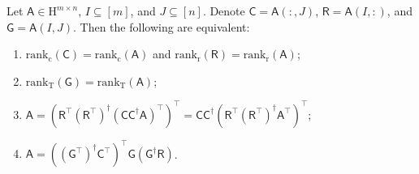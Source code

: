 \documentclass[onefignum,onetabnum]{siamart250211}
\newcommand{\Hilb}{\mathrm{H}}
\newcommand{\Batrix}[1]{\bm{\Matrix{#1}}}
\newcommand{\Matrix}[1]{\mathsf{#1}}
\newcommand{\trans}{\intercal}
\newcommand{\pinv}{\dagger}
\newcommand{\Rank}[3][]{\mathrm{rank_{#2}} #1( #3 #1)}
\newcommand{\Index}[1]{{#1}}
\begin{document}
\begin{theorem}
\label{theorem:cross_exact}
Let $\Batrix{A} \in \Hilb^{m \times n}$, $\Index{I} \subseteq [m]$, and $\Index{J} \subseteq [n]$.
Denote $\Batrix{C} = \Batrix{A}(:, \Index{J})$, $\Batrix{R} = \Batrix{A}(\Index{I},:)$, and $\Batrix{G} = \Batrix{A}(\Index{I}, \Index{J})$. Then the following are equivalent:
\begin{enumerate}
    \item $\Rank{c}{\Batrix{C}} = \Rank{c}{\Batrix{A}}$ and $\Rank{r}{\Batrix{R}} = \Rank{r}{\Batrix{A}}$;
    \item $\Rank{T}{\Batrix{G}} = \Rank{T}{\Batrix{A}}$;
    \item $\Batrix{A} = (\Batrix{R}^\trans (\Batrix{R}^\trans)^\pinv (\Batrix{C} \Batrix{C}^\pinv \Batrix{A})^\trans)^\trans = \Batrix{C} \Batrix{C}^\pinv (\Batrix{R}^\trans (\Batrix{R}^\trans)^\pinv \Batrix{A}^\trans)^\trans$;
    \item $\Batrix{A} = ((\Batrix{G}^\trans)^\pinv \Batrix{C}^\trans)^\trans \Batrix{G} (\Batrix{G}^\pinv \Batrix{R})$.
\end{enumerate}
\end{theorem}
\end{document}
